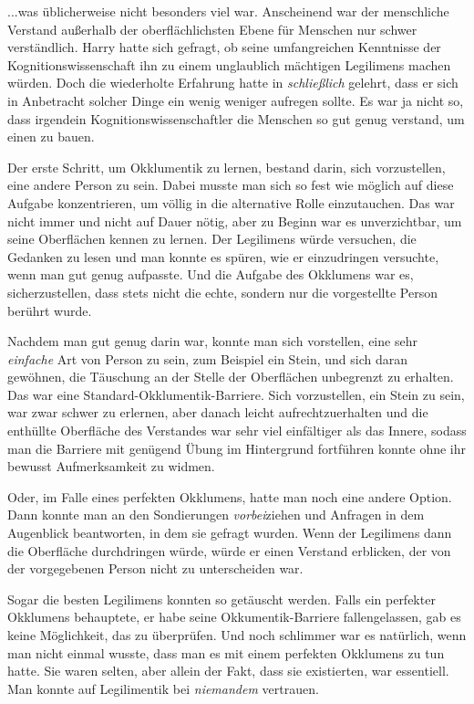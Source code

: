 {...was üblicherweise nicht besonders viel war. Anscheinend war der menschliche Verstand außerhalb der oberflächlichsten Ebene für Menschen nur schwer verständlich. Harry hatte sich gefragt, ob seine umfangreichen Kenntnisse der Kognitionswissenschaft ihn zu einem unglaublich mächtigen Legilimens machen würden. Doch die wiederholte Erfahrung hatte in \emph{schließlich} gelehrt, dass er sich in Anbetracht solcher Dinge ein wenig weniger aufregen sollte. Es war ja nicht so, dass irgendein Kognitionswissenschaftler die Menschen so gut genug verstand, um einen zu bauen.

Der erste Schritt, um Okklumentik zu lernen, bestand darin, sich vorzustellen, eine andere Person zu sein. Dabei musste man sich so fest wie möglich auf diese Aufgabe konzentrieren, um völlig in die alternative Rolle einzutauchen. Das war nicht immer und nicht auf Dauer nötig, aber zu Beginn war es unverzichtbar, um seine Oberflächen kennen zu lernen. Der Legilimens würde versuchen, die Gedanken zu lesen und man konnte es spüren, wie er einzudringen versuchte, wenn man gut genug aufpasste. Und die Aufgabe des Okklumens war es, sicherzustellen, dass stets nicht die echte, sondern nur die vorgestellte Person berührt wurde.

Nachdem man gut genug darin war, konnte man sich vorstellen, eine sehr \emph{einfache} Art von Person zu sein, zum Beispiel ein Stein, und sich daran gewöhnen, die Täuschung an der Stelle der Oberflächen unbegrenzt zu erhalten. Das war eine Standard-Okklumentik-Barriere. Sich vorzustellen, ein Stein zu sein, war zwar schwer zu erlernen, aber danach leicht aufrechtzuerhalten und die enthüllte Oberfläche des Verstandes war sehr viel einfältiger als das Innere, sodass man die Barriere mit genügend Übung im Hintergrund fortführen konnte ohne ihr bewusst Aufmerksamkeit zu widmen.

Oder, im Falle eines perfekten Okklumens, hatte man noch eine andere Option. Dann konnte man an den Sondierungen \emph{vorbei}ziehen und Anfragen in dem Augenblick beantworten, in dem sie gefragt wurden. Wenn der Legilimens dann die Oberfläche durchdringen würde, würde er einen Verstand erblicken, der von der vorgegebenen Person nicht zu unterscheiden war.

Sogar die besten Legilimens konnten so getäuscht werden. Falls ein perfekter Okklumens behauptete, er habe seine Okkumentik-Barriere fallengelassen, gab es keine Möglichkeit, das zu überprüfen. Und noch schlimmer war es natürlich, wenn man nicht einmal wusste, dass man es mit einem perfekten Okklumens zu tun hatte. Sie waren selten, aber allein der Fakt, dass sie existierten, war essentiell. Man konnte auf Legilimentik bei \emph{niemandem} vertrauen.

}
